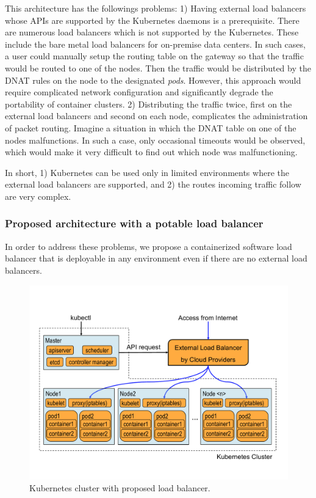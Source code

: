 This architecture has the followings problems: 
1) Having external load balancers whose APIs are supported by the Kubernetes daemons is a prerequisite. 
There are numerous load balancers which is not supported by the Kubernetes.
These include the bare metal load balancers for on-premise data centers.  
In such cases, a user could manually setup the routing table on the gateway so that the traffic would be routed to one of the nodes.
Then the traffic would be distributed by the DNAT rules on the node to the designated {\em pods}.
However, this approach would require complicated network configuration and significantly degrade the portability of container clusters.
2) Distributing the traffic twice, first on the external load balancers and second on each node, 
complicates the administration of packet routing. 
Imagine a situation in which the DNAT table on one of the nodes malfunctions.
In such a case, only occasional timeouts would be observed, which would make it very difficult to find out which node was malfunctioning.   

In short, 1) Kubernetes can be used only in limited environments where the external load balancers are supported, 
and 2) the routes incoming traffic follow are very complex.

\subsubsection{Proposed architecture with a potable load balancer}

In order to address these problems, we propose a containerized software load balancer 
that is deployable in any environment even if there are no external load balancers.

\begin{figure}
\includegraphics[width=\columnwidth]{Figs/K8sProposed}
\caption{Kubernetes cluster with proposed load balancer.}
\label{fig:K8sProposed}
\end{figure}

